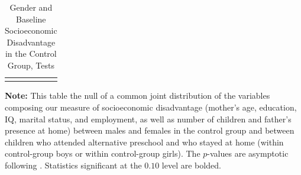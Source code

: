 \begin{table}[!htpb]
\begin{threeparttable}
\caption{Gender and Baseline Socioeconomic Disadvantage in the Control Group, Tests} \label{table:disadtests}
\centering 
\begin{tabularx}{16.5cm}{XcX}
&  & 
\end{tabularx}
\begin{tablenotes}
\footnotesize
\item \textbf{Note:} This table the null of a common joint distribution of the variables composing our measure of socioeconomic disadvantage (mother's age, education, IQ, marital status, and employment, as well as number of children and father's presence at home) between males and females in the control group and between children who attended  alternative preschool and who stayed at home (within control-group boys or within control-group girls). The $p$-values are asymptotic following \citet{Rosenbaum_2005_Distribution_JRSS}. Statistics significant at the $0.10$ level are bolded.
\end{tablenotes}
\end{threeparttable}
\end{table}










